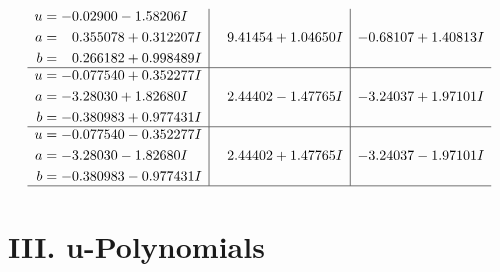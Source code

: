 \documentclass[1p]{elsarticle_modified}
\theoremstyle{definition}
\begin{document}
$$\begin{array}{c|c|c}
\begin{aligned}
u &= -0.02900 - 1.58206 I \\
a &= \phantom{-}0.355078 + 0.312207 I \\
b &= \phantom{-}0.266182 + 0.998489 I\end{aligned}
 & \phantom{-}9.41454 + 1.04650 I & -0.68107 + 1.40813 I \\ \hline\begin{aligned}
u &= -0.077540 + 0.352277 I \\
a &= -3.28030 + 1.82680 I \\
b &= -0.380983 + 0.977431 I\end{aligned}
 & \phantom{-}2.44402 - 1.47765 I & -3.24037 + 1.97101 I \\ \hline\begin{aligned}
u &= -0.077540 - 0.352277 I \\
a &= -3.28030 - 1.82680 I \\
b &= -0.380983 - 0.977431 I\end{aligned}
 & \phantom{-}2.44402 + 1.47765 I & -3.24037 - 1.97101 I\\
 \hline 
 \end{array}$$\newpage
\newpage\renewcommand{\arraystretch}{1}
\centering \section*{ III. u-Polynomials}
\end{document}
